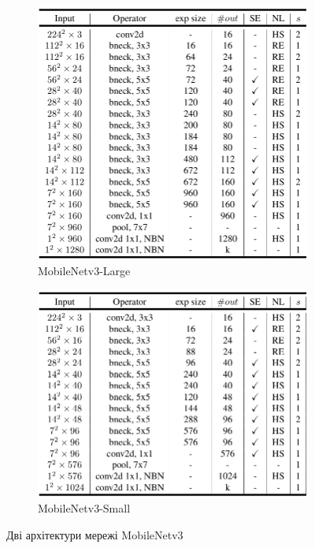 \begin{figure}[H]
    \centering
    \begin{subfigure}[c]{0.4\textwidth}
        \centering
        \includegraphics[width=\textwidth]{images/cnn_mobilenetv3_large_architecture}
        \caption{MobileNetv3-Large
        }
    \end{subfigure}
    \begin{subfigure}[c]{0.4\textwidth}
        \centering
        \includegraphics[width=\textwidth]{images/cnn_mobilenetv3_small_architecture}
        \caption{MobileNetv3-Small
        }
    \end{subfigure}
    \caption{Дві архітектури мережі MobileNetv3 \cite{mobilenetv3}
    }
\end{figure}

\clearpage